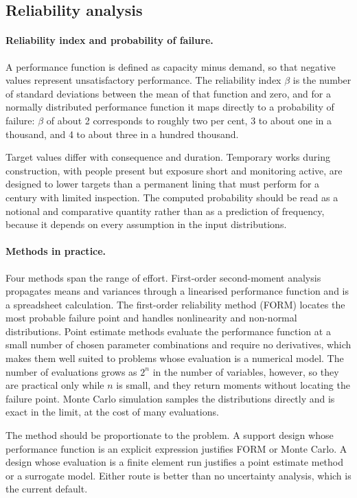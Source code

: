 \subsection{Reliability analysis}
\label{sec:reliability-analysis}

\paragraph{Reliability index and probability of failure.}
A performance function is defined as capacity minus demand, so that negative
values represent unsatisfactory performance. The reliability index $\beta$ is
the number of standard deviations between the mean of that function and zero,
and for a normally distributed performance function it maps directly to a
probability of failure: $\beta$ of about 2 corresponds to roughly two per
cent, 3 to about one in a thousand, and 4 to about three in a hundred
thousand.

Target values differ with consequence and duration. Temporary works during
construction, with people present but exposure short and monitoring active,
are designed to lower targets than a permanent lining that must perform for a
century with limited inspection. The computed probability should be read as a
notional and comparative quantity rather than as a prediction of frequency,
because it depends on every assumption in the input distributions.

\paragraph{Methods in practice.}
Four methods span the range of effort. First-order second-moment analysis
propagates means and variances through a linearised performance function and
is a spreadsheet calculation. The first-order reliability method (FORM)
locates the
most probable failure point and handles nonlinearity and non-normal
distributions. Point estimate methods evaluate the performance
function at a small number of chosen parameter combinations and require no
derivatives, which makes them well suited to problems whose evaluation is a
numerical model. The number of evaluations grows as $2^n$ in the number of
variables, however, so they are practical only while $n$ is small, and they
return moments without locating the failure point. Monte Carlo simulation samples the distributions directly and
is exact in the limit, at the cost of many evaluations.

The method should be proportionate to the problem. A support design whose performance function is
an explicit expression justifies FORM or Monte Carlo. A design whose
evaluation is a finite element run justifies a point estimate method or a
surrogate model. Either route is better than no uncertainty analysis, which
is the current default.

